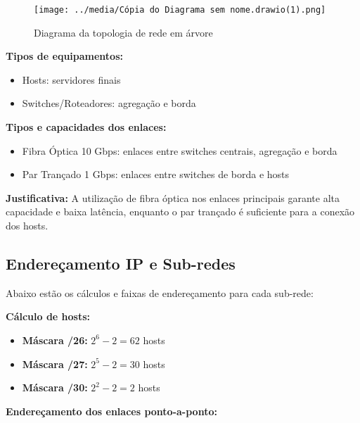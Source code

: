 \documentclass[conference,compsoc]{IEEEtran}
\begin{document}
\begin{otherlanguage}{brazil}
\begin{figure}[!h]
\centering
\texttt{[image: ../media/Cópia do Diagrama sem nome.drawio(1).png]}
\caption{Diagrama da topologia de rede em árvore}
\label{fig:topologia_projeto2}
\end{figure}

\textbf{Tipos de equipamentos:}
\begin{itemize}
    \item Hosts: servidores finais
    \item Switches/Roteadores: agregação e borda
\end{itemize}

\textbf{Tipos e capacidades dos enlaces:}
\begin{itemize}
    \item Fibra Óptica 10 Gbps: enlaces entre switches centrais, agregação e borda
    \item Par Trançado 1 Gbps: enlaces entre switches de borda e hosts
\end{itemize}

\textbf{Justificativa:} A utilização de fibra óptica nos enlaces principais garante alta capacidade e baixa latência, enquanto o par trançado é suficiente para a conexão dos hosts.

\subsection{Endereçamento IP e Sub-redes}

Abaixo estão os cálculos e faixas de endereçamento para cada sub-rede:

\textbf{Cálculo de hosts:}

\begin{itemize}
    \item \textbf{Máscara /26:} $2^6 - 2 = 62$ hosts
    \item \textbf{Máscara /27:} $2^5 - 2 = 30$ hosts
    \item \textbf{Máscara /30:} $2^2 - 2 = 2$ hosts
\end{itemize}

\textbf{Endereçamento dos enlaces ponto-a-ponto:}


\end{otherlanguage}
\end{document}
